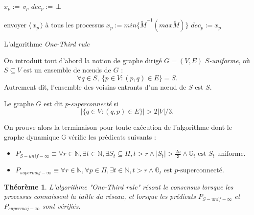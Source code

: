 \documentclass{article}
\newtheorem{theorem}{Théorème}
\begin{document}
\begin{algorithm}[htb]
\begin{distribalgo}[1]
\BLANK {}
  \STATE $x_p :=\, v_p$ 
  \STATE $dec_p :=\, \bot$ 

\ENDINDENT \BLANK

    \STATE envoyer $\langle\, x_p\, \rangle$ à tous les processus
  \ENDINDENT
  \BLANK
	  \STATE $x_p := min \{\widetilde{M}^{-1} (max \widetilde{M})\}$ 
		  \STATE $dec_p := x_p$ 
        \ENDIF
      \ENDIF
  \ENDINDENT
\ENDINDENT \BLANK


\caption{L'algorithme {\em One-Third rule}} \label{algo:R}
\end{distribalgo}

\end{algorithm}

On introduit tout d'abord la notion de graphe dirigé $G=(V,E)$ \emph{$S$-uniforme}, où $S\subseteq V$ est un ensemble de nœuds de $G$ :
	$$ \forall q \in S, \  \{ p \in V : (p,q) \in E\} = S .$$
Autrement dit, l'ensemble des voisins entrants d'un nœud de $S$ est $S$.

Le graphe $G$ est dit $p$-\emph{superconnecté} si 
	$$ | \{ q \in V : (q ,p ) \in E\} | > 2 |V|/3 .$$

On prouve alors la terminaison pour toute exécution de l'algorithme dont le graphe dynamique $ \mathds{G} $ vérifie  les prédicats suivants :
\begin{itemize}
	\item $P_{S-unif-\infty} \equiv
		\forall r \in \mathds{N}, \exists t \in \mathds{N}, \exists S_t \subseteq \Pi, t > r  \wedge |S_t | > \frac{2 n}{3} \wedge  \mathds{G}_t \mbox{ est $S_t $-uniforme} .$
	 \item $P_{supermaj-\infty} \equiv
		\forall r \in \mathds{N}, \forall p\in\Pi, \exists t \in \mathds{N}, t > r  \wedge \mathds{G}_t \mbox{ est $p$-superconnecté} .$
\end{itemize}

\begin{theorem}
	L'algorithme "One-Third rule" résout  le consensus lorsque les processus connaissent la taille du réseau,
	et lorsque les prédicats $P_{S-unif-\infty}$ et $P_{supermaj-\infty}$ sont vérifiés.
\end{theorem}
\end{document}
